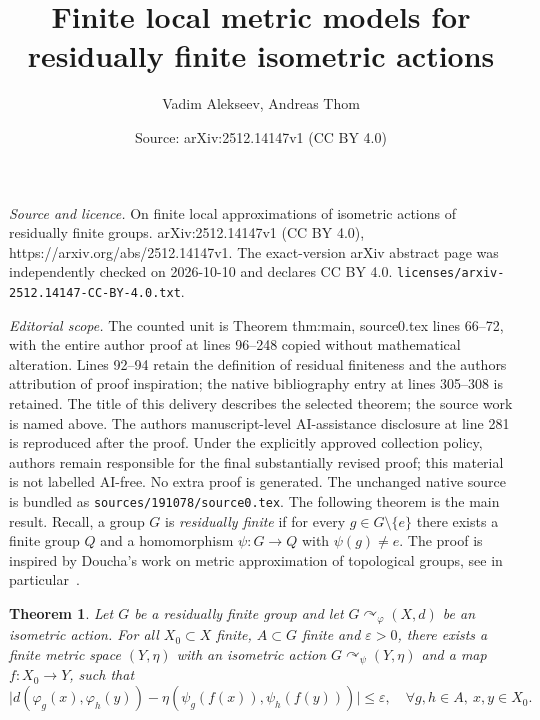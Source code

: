 \documentclass[10pt,a4paper]{amsart}
\title{Finite local metric models for residually finite isometric actions}
\author{Vadim Alekseev, Andreas Thom}
\date{Source: arXiv:2512.14147v1 (CC BY 4.0)}
\newtheorem{theorem}{Theorem}
\begin{document}
\maketitle

\noindent\emph{Source and licence.} On finite local approximations of isometric actions of residually finite groups. arXiv:2512.14147v1 (CC BY 4.0), https://arxiv.org/abs/2512.14147v1. The exact-version arXiv abstract page was independently checked on 2026-10-10 and declares CC BY 4.0. \texttt{licenses/arxiv-2512.14147-CC-BY-4.0.txt}.\par\smallskip

\noindent\textit{Editorial scope.} The counted unit is Theorem thm:main, source0.tex lines 66--72, with the entire author proof at lines 96--248 copied without mathematical alteration. Lines 92--94 retain the definition of residual finiteness and the authors\textquotesingle{} attribution of proof inspiration; the native bibliography entry at lines 305--308 is retained. The title of this delivery describes the selected theorem; the source work is named above. The authors\textquotesingle{} manuscript-level AI-assistance disclosure at line 281 is reproduced after the proof. Under the explicitly approved collection policy, authors remain responsible for the final substantially revised proof; this material is not labelled AI-free. No extra proof is generated. The unchanged native source is bundled as \texttt{sources/191078/source0.tex}.
The following theorem is the main result. Recall, a group $G$ is \emph{residually finite} if for every $g\in G\setminus\{e\}$ there exists a finite group $Q$ and a homomorphism $\psi\colon G\to Q$ with $\psi(g)\neq e$. The proof is inspired
by Doucha's work on metric approximation of topological groups,
see in particular~\cite[Proposition 3.9]{DouchaMetricTopGroups}.

\begin{theorem} \label{thm:main}
Let $G$ be a residually finite group and let $G \curvearrowright_{\varphi} (X,d)$ be an isometric action. For all $X_0 \subset X$ finite, $A \subset G$ finite and $\varepsilon>0$, there exists a finite metric space $(Y,\eta)$ with an isometric action $G \curvearrowright_\psi (Y,\eta)$ and a map $f \colon X_0 \to Y$, such that
\[
\bigl|d(\varphi_g(x),\varphi_h(y)) - \eta(\psi_g(f(x)),\psi_h(f(y)))\bigr|\leq \varepsilon,
\quad \forall g,h \in A, \ x,y\in X_0.
\]
\end{theorem}
\end{document}
